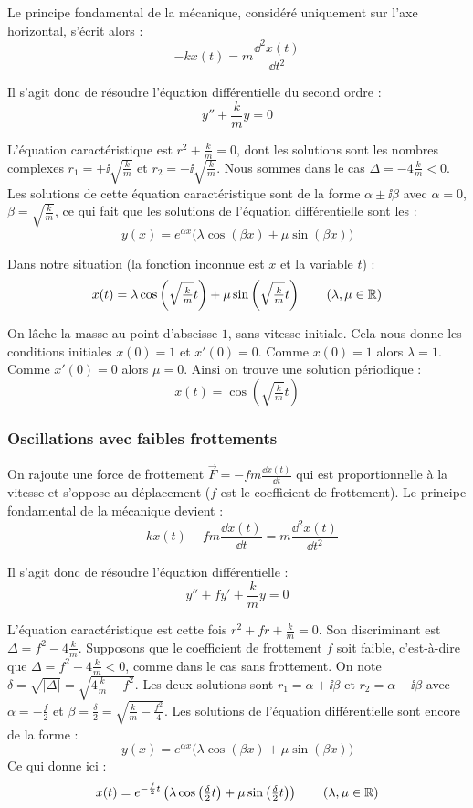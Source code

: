 \documentclass[class=report,crop=false]{standalone}
\begin{document}
Le principe fondamental de la mécanique, considéré uniquement sur l'axe horizontal,
s'écrit alors :
$$-kx(t) = m\frac{\dd^2 x(t)}{\dd t^2}$$

Il s'agit donc de résoudre l'équation différentielle du second ordre :
$$y'' + \frac{k}{m} y = 0$$

L'équation caractéristique est $r^2+\frac{k}{m} = 0$,
dont les solutions sont les nombres complexes
$r_1 = +\ii\sqrt{\frac{k}{m}}$ et $r_2 = -\ii\sqrt{\frac{k}{m}}$.
Nous sommes dans le cas $\Delta = -4\frac{k}{m} <0$.
Les solutions de cette équation caractéristique sont de la forme
$\alpha \pm \ii \beta$ avec $\alpha=0$, $\beta = \sqrt{\frac{k}{m}}$,
ce qui fait que les solutions de l'équation différentielle sont
les :
$$y(x) = e^{\alpha x}\big(\lambda\cos (\beta x)+\mu\sin (\beta x)\big)$$

Dans notre situation (la fonction inconnue est $x$ et la variable $t$) :
$$x(t) = \lambda\cos \left(\sqrt{\tfrac{k}{m}}t\right)
+\mu\sin \left(\sqrt{\tfrac{k}{m}}t\right)
\qquad (\lambda, \mu \in \mathbb{R})$$

\begin{exemple}
On lâche la masse au point d'abscisse $1$, sans vitesse initiale.
Cela nous donne les conditions initiales
$x(0)=1$ et $x'(0)=0$.
Comme $x(0)=1$ alors $\lambda=1$. Comme
$x'(0) = 0$ alors $\mu = 0$.
Ainsi on trouve une solution périodique :
$$x(t) = \cos \left(\sqrt{\tfrac{k}{m}}t\right)$$

\end{exemple}


\subsubsection*{Oscillations avec faibles frottements}

On rajoute une force de frottement $\vec F =  -fm \frac{\dd x(t)}{\dd t}$
qui est proportionnelle à la vitesse et s'oppose au déplacement
($f$ est le coefficient de frottement).
Le principe fondamental de la mécanique devient :
$$-kx(t)-fm \frac{\dd x(t)}{\dd t} = m\frac{\dd^2 x(t)}{\dd t^2}$$

Il s'agit donc de résoudre l'équation différentielle :
$$y'' + f y' + \frac{k}{m} y = 0$$

L'équation caractéristique est cette fois $r^2+fr+\frac{k}{m}=0$.
Son discriminant est  $\Delta = f^2-4\frac{k}{m}$.
Supposons que le coefficient de frottement $f$ soit faible, c'est-à-dire
que $\Delta = f^2-4\frac{k}{m} <0$, comme dans le cas sans frottement.
On note $\delta = \sqrt{|\Delta|} = \sqrt{4\frac{k}{m} - f^{2}}$.
Les deux solutions sont
$r_1 = \alpha + \ii \beta$ et $r_2 = \alpha - \ii \beta$ avec
$\alpha = -\frac{f}{2}$ et $\beta = \frac{\delta}{2} = \sqrt{\frac{k}{m} - \frac{f^{2}}{4}}$.
Les solutions de l'équation différentielle sont encore de la forme :
$$y(x) = e^{\alpha x}\big(\lambda\cos (\beta x)+\mu\sin (\beta x)\big)$$
Ce qui donne ici :
$$x(t) = e^{-\frac{f}{2} t}\left(\lambda\cos \left(\tfrac{\delta}{2}t\right)
+\mu\sin \left(\tfrac{\delta}{2}t\right)\right)\qquad (\lambda, \mu \in \mathbb{R})$$
\end{document}
